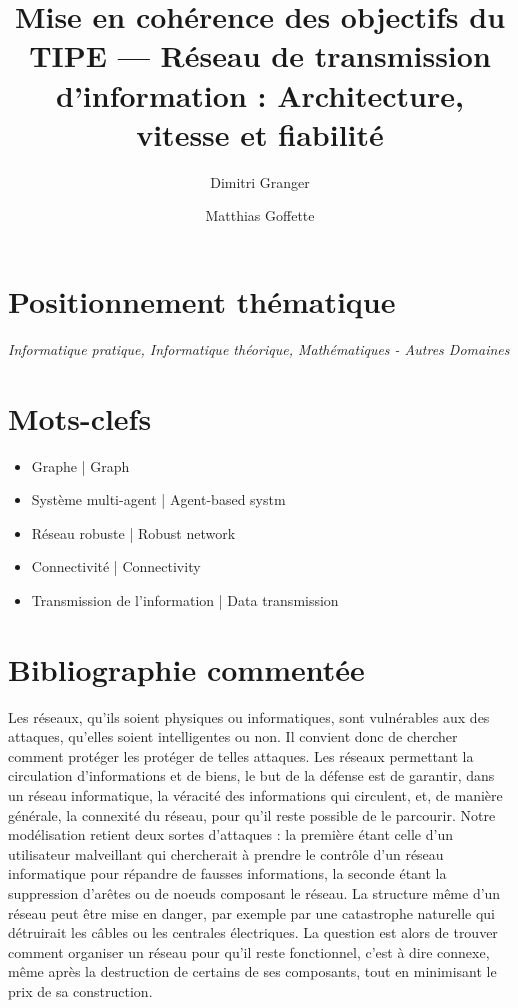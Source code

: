 \documentclass[11pt,a4paper]{article}
\title{Mise en cohérence des objectifs du TIPE --- Réseau de transmission d'information : Architecture, vitesse et fiabilité}
\author{Dimitri Granger \and Matthias Goffette}
\begin{document}
\maketitle


\section{Positionnement thématique}


%

\emph{Informatique pratique, Informatique théorique, Mathématiques - Autres Domaines}


\section{Mots-clefs}

%
%

\begin{it}
\begin{itemize}
	\item Graphe | Graph
	\item Système multi-agent | Agent-based systm
	\item Réseau robuste | Robust network
	\item Connectivité | Connectivity
	\item Transmission de l'information | Data transmission
\end{itemize}
\end{it}


\section{Bibliographie commentée}




	Les réseaux, qu'ils soient physiques ou informatiques, sont vulnérables aux des attaques, qu'elles soient intelligentes ou non. Il convient donc de chercher comment protéger les protéger de telles attaques. Les réseaux permettant la circulation d'informations et de biens, le but de la défense est de garantir, dans un réseau informatique, la véracité des informations qui circulent, et, de manière générale, la connexité du réseau, pour qu'il reste possible de le parcourir. Notre modélisation retient deux sortes d'attaques : la première étant celle d'un utilisateur malveillant qui chercherait à prendre le contrôle d'un réseau informatique pour répandre de fausses informations, la seconde étant la suppression d'arêtes ou de noeuds composant le réseau. La structure même d'un réseau peut être mise en danger, par exemple par une catastrophe naturelle qui détruirait les câbles ou les centrales électriques. La question est alors de trouver comment organiser un réseau pour qu'il reste fonctionnel, c'est à dire connexe, même après la destruction de certains de ses composants, tout en minimisant le prix de sa construction. 
	
\end{document}
